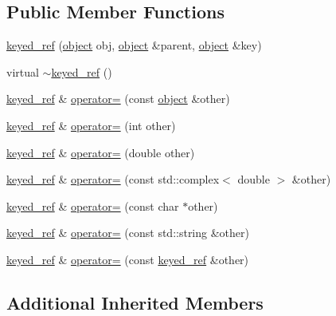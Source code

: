 \subsection*{Public Member Functions}
\begin{DoxyCompactItemize}
\item 
\hyperlink{classpy_1_1object_1_1keyed__ref_a0da1fad348a376256e52baa616738f14}{keyed\+\_\+ref} (\hyperlink{classpy_1_1object}{object} obj, \hyperlink{classpy_1_1object}{object} \&parent, \hyperlink{classpy_1_1object}{object} \&key)
\item 
virtual \hyperlink{classpy_1_1object_1_1keyed__ref_a3ccad19f958aa4bca9f0af0e6a018ffb}{$\sim$keyed\+\_\+ref} ()
\item 
\hyperlink{classpy_1_1object_1_1keyed__ref}{keyed\+\_\+ref} \& \hyperlink{classpy_1_1object_1_1keyed__ref_a5a16bbaafe10b9623dee5ddc29b6b1c7}{operator=} (const \hyperlink{classpy_1_1object}{object} \&other)
\item 
\hyperlink{classpy_1_1object_1_1keyed__ref}{keyed\+\_\+ref} \& \hyperlink{classpy_1_1object_1_1keyed__ref_a870b54ed2b0402b1cbd6f9a8debaf69c}{operator=} (int other)
\item 
\hyperlink{classpy_1_1object_1_1keyed__ref}{keyed\+\_\+ref} \& \hyperlink{classpy_1_1object_1_1keyed__ref_a1104c536f454208ac6feca01f300b8d2}{operator=} (double other)
\item 
\hyperlink{classpy_1_1object_1_1keyed__ref}{keyed\+\_\+ref} \& \hyperlink{classpy_1_1object_1_1keyed__ref_ad8898beca58ddcbf8936382b4b1ba155}{operator=} (const std\+::complex$<$ double $>$ \&other)
\item 
\hyperlink{classpy_1_1object_1_1keyed__ref}{keyed\+\_\+ref} \& \hyperlink{classpy_1_1object_1_1keyed__ref_ac5a54d3dbf0d1d087c9bb02b725fbf36}{operator=} (const char $\ast$other)
\item 
\hyperlink{classpy_1_1object_1_1keyed__ref}{keyed\+\_\+ref} \& \hyperlink{classpy_1_1object_1_1keyed__ref_ae339f43195d2c5f6946c39871c0e6d1a}{operator=} (const std\+::string \&other)
\item 
\hyperlink{classpy_1_1object_1_1keyed__ref}{keyed\+\_\+ref} \& \hyperlink{classpy_1_1object_1_1keyed__ref_a71f097cc8f53d065d5164701d901e320}{operator=} (const \hyperlink{classpy_1_1object_1_1keyed__ref}{keyed\+\_\+ref} \&other)
\end{DoxyCompactItemize}
\subsection*{Additional Inherited Members}



